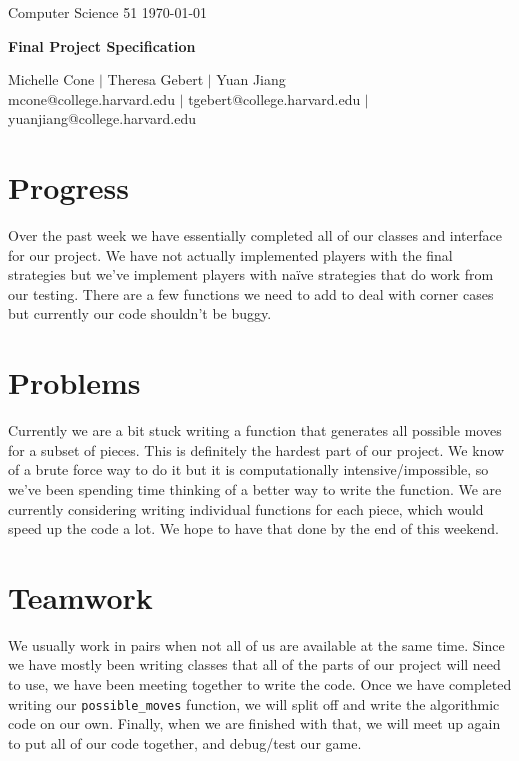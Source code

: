 \documentclass[11pt]{article}
\begin{document}
\doublespacing

\noindent Computer Science 51 \hfill \today\\
\noindent\makebox[\linewidth]{\rule{6.5in}{2.0pt}}

\begin{center}

{{\LARGE \bf Final Project Specification}} \\
\vspace{3mm}
{{\LARGE \bf }}

\noindent\makebox[\linewidth]{\rule{6.5in}{2.0pt}}

\vspace{3mm}

{\large Michelle Cone $|$ Theresa Gebert $|$ Yuan Jiang \\
\normalsize mcone@college.harvard.edu $|$ tgebert@college.harvard.edu $|$ yuanjiang@college.harvard.edu} \\

\end{center}


\vspace{2mm}

\section{Progress}
Over the past week we have essentially completed all of our classes and interface for our project. We have not actually implemented players with the final strategies but we've implement players with na{\"i}ve strategies that do work from our testing. There are a few functions we need to add to deal with corner cases but currently our code shouldn't be buggy. 
\section{Problems}
Currently we are a bit stuck writing a function that generates all possible moves for a subset of pieces. This is definitely the hardest part of our project. We know of a brute force way to do it but it is computationally intensive/impossible, so we've been spending time thinking of a better way to write the function. We are currently considering writing individual functions for each piece, which would speed up the code a lot. We hope to have that done by the end of this weekend.  
\section{Teamwork}
We usually work in pairs when not all of us are available at the same time. Since we have mostly been writing classes that all of the parts of our project will need to use, we have been meeting together to write the code. Once we have completed writing our \texttt{possible\_moves} function, we will split off and write the algorithmic code on our own. Finally, when we are finished with that, we will meet up again to put all of our code together, and debug/test our game. 
\end{document}
